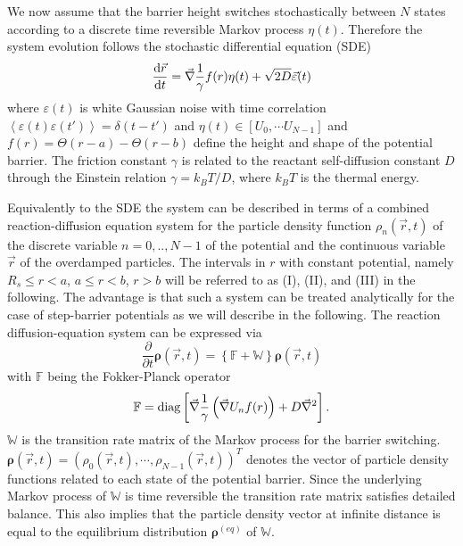 \documentclass[preprint,superscriptaddress]{revtex4-1}
\newcommand{\vect}[1]{\boldsymbol{\mathbf{#1}}}
\begin{document}
We now assume that the barrier height switches stochastically between $N$ states according to a discrete time reversible Markov process $\eta(t)$. Therefore the system evolution follows the stochastic differential equation (SDE) 
\begin{equation}
    \frac{{\rm d} \vec{r}}{{\rm d} t} = \vec{\nabla}\frac{1}{\gamma}f(r)\eta(t) + \sqrt{2D}\vec{\varepsilon}(t)
    \label{SDE}
\end{equation}
where $\varepsilon(t)$ is white Gaussian noise with time correlation $\left< \varepsilon(t) \varepsilon(t') \right> = \delta(t-t')$ and $\eta(t) \in [U_0,\cdots U_{N-1}]$ and $f(r) = \Theta(r-a)-\Theta(r-b)$ define the height and shape of the potential barrier. The friction constant $\gamma$ is related to the reactant self-diffusion constant $D$ through the Einstein relation $\gamma = k_BT/D$, where $k_BT$ is the thermal energy.  

Equivalently to the SDE the system can be described in terms of a combined reaction-diffusion equation system for the particle density function $\rho_n(\vec{r},t)$ of the discrete variable $n=0,..,N-1$ of the potential and the continuous variable $\vec{r}$ of the overdamped particles.
The intervals in $r$ with constant potential, namely $R_s \le r < a$, $a \le r <  b$, $r>b$ will be referred to as (I), (II), and (III) in the following. 
The advantage is that such a system can be treated analytically for the case of step-barrier potentials as we will describe in the following. 
The reaction diffusion-equation system can be expressed via
\begin{equation}
    \frac{\partial}{\partial t}\vect{\rho}(\vec{r},t) = \left\{ \mathbb{F} + \mathbb{W} \right\} \vect{\rho}(\vec{r},t)
    \label{mfpe}
\end{equation}
with $\mathbb{F}$ being the Fokker-Planck operator
\begin{equation}
    \mathbb{F} = {\rm  diag}\left[\vec{\nabla} \frac{1}{\gamma} \left(\vec{\nabla} U_n f(r)\right) + D\vec{\nabla}^{2} \right].
    \label{FPO}
\end{equation}
$\mathbb{W}$ is the transition rate matrix of the Markov process for the barrier switching. $\vect{\rho}(\vec{r},t)=(\rho_0(\vec{r},t),\cdots,\rho_{N-1}(\vec{r},t))^{T}$ denotes the vector of particle density functions related to each state of the potential barrier. Since the underlying Markov process of $\mathbb{W}$ is time reversible the transition rate matrix satisfies detailed balance. This also implies that the particle density vector at infinite distance is equal to the equilibrium distribution $\vect{\rho}^{(eq)}$ of $\mathbb{W}$. 
\end{document}
